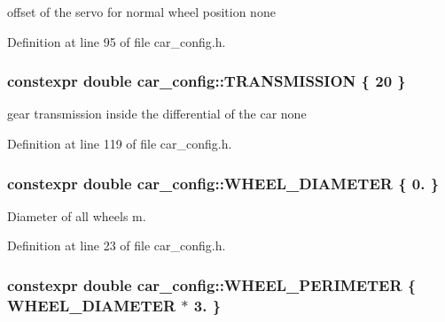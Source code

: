 offset of the servo for normal wheel position  none 



Definition at line 95 of file car\+\_\+config.\+h.

\subsubsection[{\texorpdfstring{T\+R\+A\+N\+S\+M\+I\+S\+S\+I\+ON}{TRANSMISSION}}]{\setlength{\rightskip}{0pt plus 5cm}constexpr double car\+\_\+config\+::\+T\+R\+A\+N\+S\+M\+I\+S\+S\+I\+ON \{ 20 \}}\hypertarget{namespacecar__config_a7af97a6c9168673aba8917029cfe44d3}{}\label{namespacecar__config_a7af97a6c9168673aba8917029cfe44d3}


gear transmission inside the differential of the car  none 



Definition at line 119 of file car\+\_\+config.\+h.

\subsubsection[{\texorpdfstring{W\+H\+E\+E\+L\+\_\+\+D\+I\+A\+M\+E\+T\+ER}{WHEEL_DIAMETER}}]{\setlength{\rightskip}{0pt plus 5cm}constexpr double car\+\_\+config\+::\+W\+H\+E\+E\+L\+\_\+\+D\+I\+A\+M\+E\+T\+ER \{ 0. \}}\hypertarget{namespacecar__config_a6f064e331d6d85d46028dfbe75f063dd}{}\label{namespacecar__config_a6f064e331d6d85d46028dfbe75f063dd}


Diameter of all wheels  m. 



Definition at line 23 of file car\+\_\+config.\+h.

\subsubsection[{\texorpdfstring{W\+H\+E\+E\+L\+\_\+\+P\+E\+R\+I\+M\+E\+T\+ER}{WHEEL_PERIMETER}}]{\setlength{\rightskip}{0pt plus 5cm}constexpr double car\+\_\+config\+::\+W\+H\+E\+E\+L\+\_\+\+P\+E\+R\+I\+M\+E\+T\+ER \{ {\bf W\+H\+E\+E\+L\+\_\+\+D\+I\+A\+M\+E\+T\+ER} $\ast$ 3. \}}\hypertarget{namespacecar__config_a46fe00906da07d2e030b586a634cd907}{}\label{namespacecar__config_a46fe00906da07d2e030b586a634cd907}


